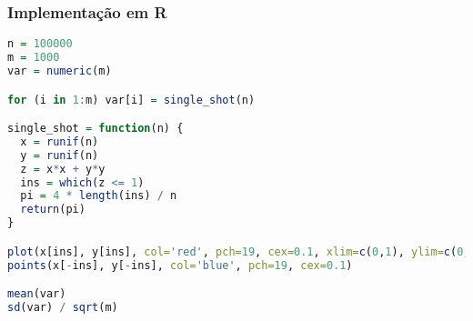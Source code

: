 \documentclass[12pt]{article}
\begin{document}
\subsubsection{Implementação em R}
\begin{lstlisting}[language=R, caption=Pi via Monte Carlo em R]
n = 100000
m = 1000
var = numeric(m)

for (i in 1:m) var[i] = single_shot(n)

single_shot = function(n) {
  x = runif(n)
  y = runif(n)
  z = x*x + y*y
  ins = which(z <= 1)
  pi = 4 * length(ins) / n
  return(pi)
}

plot(x[ins], y[ins], col='red', pch=19, cex=0.1, xlim=c(0,1), ylim=c(0,1))
points(x[-ins], y[-ins], col='blue', pch=19, cex=0.1)

mean(var)
sd(var) / sqrt(m)
\end{lstlisting}
\newpage
\end{document}
